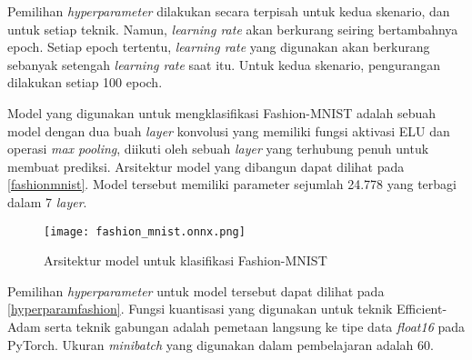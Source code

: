 Pemilihan \emph{hyperparameter} dilakukan secara terpisah untuk kedua skenario, dan untuk setiap teknik. Namun, \emph{learning rate} akan berkurang seiring bertambahnya epoch. Setiap epoch tertentu, \emph{learning rate} yang digunakan akan berkurang sebanyak setengah \emph{learning rate} saat itu. Untuk kedua skenario, pengurangan dilakukan setiap 100 epoch.

Model yang digunakan untuk mengklasifikasi Fashion-MNIST adalah sebuah model dengan dua buah \emph{layer} konvolusi yang memiliki fungsi aktivasi ELU dan operasi \emph{max pooling}, diikuti oleh sebuah \emph{layer} yang terhubung penuh untuk membuat prediksi. Arsitektur model yang dibangun dapat dilihat pada \autoref{fashionmnist}. Model tersebut memiliki parameter sejumlah 24.778 yang terbagi dalam 7 \emph{layer}.

\begin{figure}
  \centering
  \texttt{[image: fashion\_mnist.onnx.png]}
  \caption{Arsitektur model untuk klasifikasi Fashion-MNIST}\label{fashionmnist}
\end{figure}

Pemilihan \emph{hyperparameter} untuk model tersebut dapat dilihat pada \autoref{hyperparamfashion}. Fungsi kuantisasi yang digunakan untuk teknik Efficient-Adam serta teknik gabungan adalah pemetaan langsung ke tipe data \emph{float16} pada PyTorch. Ukuran \emph{minibatch} yang digunakan dalam pembelajaran adalah 60.

